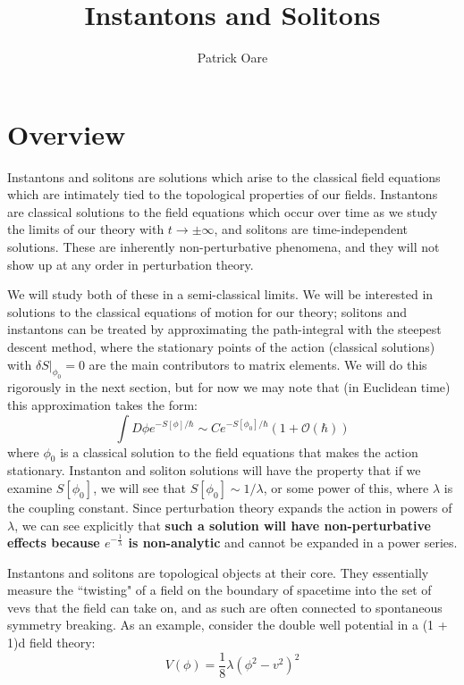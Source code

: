 \documentclass[11pt, oneside]{article}   	%
\title{Instantons and Solitons}
\author{Patrick Oare}
\date{}							%
\theoremstyle{definition}
\begin{document}
\maketitle

\section{Overview}

Instantons and solitons are solutions which arise to the classical field equations which are intimately tied to the topological properties of our 
fields. Instantons are classical solutions to the field equations which occur over time as we study the limits of our theory with $t\rightarrow\pm 
\infty$, and solitons are time-independent solutions. These are inherently non-perturbative phenomena, and they will not show up at 
any order in perturbation theory. 

We will study both of these in a semi-classical limits. We will be interested in solutions to the classical equations of motion for our theory; 
solitons and instantons can be treated by approximating the path-integral with the steepest descent method, where the stationary points 
of the action (classical solutions) with $\delta S|_{\phi_0} = 0$ are the main contributors to matrix elements. We will do this rigorously 
in the next section, but for now we may note that (in Euclidean time) this approximation takes the form:
\begin{equation}
	\int D\phi e^{-S[\phi] / \hbar}\sim C e^{-S[\phi_0] / \hbar} (1 + \mathcal O(\hbar))
\end{equation}
where $\phi_0$ is a classical solution to the field equations that makes the action stationary. Instanton and soliton solutions will have the 
property that if we examine $S[\phi_0]$, we will see that $S[\phi_0]\sim 1 / \lambda$, or some power of this, where $\lambda$ is the coupling 
constant. Since perturbation theory expands the action in powers of $\lambda$, we can see explicitly that \textbf{such a solution will have 
non-perturbative effects because $e^{-\frac{1}{\lambda}}$ is non-analytic} and cannot be expanded in a power series. 

Instantons and solitons are topological objects at their core. They essentially measure the ``twisting" of a field on the boundary of spacetime 
into the set of vevs that the field can take on, and as such are often connected to spontaneous symmetry breaking. As an example, consider 
the double well potential in a (1 + 1)d field theory:
\begin{equation}
	V(\phi) = \frac{1}{8}\lambda (\phi^2 - v^2)^2
\end{equation}
\end{document}
